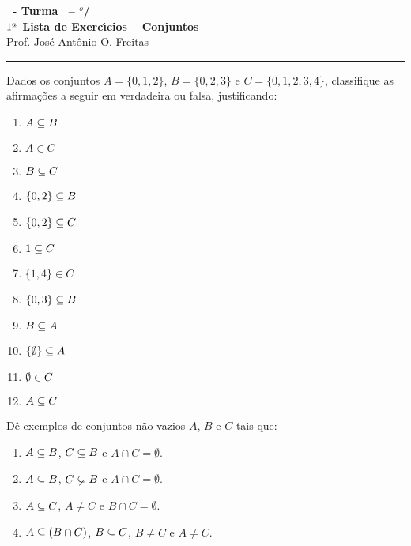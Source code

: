 \documentclass[12pt]{exam}
\begin{document}
\begin{center}
{\Large\bf \disciplina\ - Turma \turma\ -- \semestre$^{o}$/\ano} \\ \vspace{9pt} {\large\bf
  $1^{\underline{a}}$ Lista de Exerc{\'\i}cios -- Conjuntos}\\ \vspace{9pt} Prof. Jos{\'e} Ant{\^o}nio O. Freitas
\end{center}
\hrule


\vspace{.6cm}

\questao{} Dados os conjuntos $A = \{0,1,2\}$, $B = \{0,2,3\}$ e $C = \{0,1,2,3,4\}$, classifique as afirma\c{c}\~oes a seguir em verdadeira ou falsa, justificando:
\begin{multicols}{2}
	\begin{enumerate}[label={\alph*})]
		\item $A \subseteq B$
		\item $A \in C$
		\item $B \subseteq C$
		\item $\{0,2\} \subseteq B$
		\item $\{0,2\} \subseteq C$
		\item $1 \subseteq C$
		\item $\{1,4\} \in C$
		\item $\{0,3\} \subseteq B$
		\item $B \subseteq A$
		\item $\{\emptyset\} \subseteq A$
		\item $\emptyset \in C$
		\item $A \subseteq C$
	\end{enumerate}	
\end{multicols}

\questao{} D\^e exemplos de conjuntos n\~ao vazios $A$, $B$ e $C$ tais que:
\begin{enumerate}[label={\alph*})]
	\item $A \subseteq B$, $C \subseteq B$ e $A \cap C = \emptyset$.
	\item $A \subseteq B$, $C \varsubsetneq B$ e $A \cap C = \emptyset$.
	\item $A \subseteq C$, $A \ne C$ e $B \cap C = \emptyset$.
	\item $A \subseteq (B \cap C)$, $B \subseteq C$, $B \ne C$ e $A \ne C$.
\end{enumerate}

\vspace{.3cm}
\end{document}
